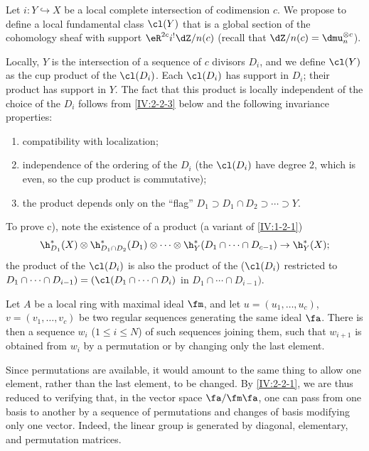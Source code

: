 Let $i:Y\hookrightarrow X$ be a local complete intersection of codimension
$c$. We propose to define a local fundamental class $\cl(Y)$ that is a
global section of the cohomology sheaf with support
$\eR^{2c}i^! \dZ/n(c)$ (recall that $\dZ/n(c)=\dmu_n^{\otimes c}$).

Locally, $Y$ is the intersection of a sequence of $c$ divisors $D_i$, and we
define $\cl(Y)$ as the cup product of the $\cl(D_i)$. Each $\cl(D_i)$ has
support in $D_i$; their product has support in $Y$. The fact that this product
is locally independent of the choice of the $D_i$ follows from
\ref{IV:2-2-3} below and the following invariance properties:
\begin{enumerate}[\indent a)]
  \item compatibility with localization;
  \item independence of the ordering of the $D_i$ (the $\cl(D_i)$ have
    degree $2$, which is even, so the cup product is commutative);
  \item the product depends only on the ``flag''
    $D_1\supset D_1\cap D_2\supset \cdots\supset Y$.
\end{enumerate}
To prove c), note the existence of a product (a variant of
\ref{IV:1-2-1})
\[
  \h_{D_1}^*(X)\otimes \h_{D_1\cap D_2}^*(D_1)\otimes \cdots \otimes \h_Y^*(D_1\cap \cdots \cap D_{c-1}) \to \h_Y^*(X) \text{;}
\]
the product of the $\cl(D_i)$ is also the product of the
($\cl(D_i)$ restricted to
$D_1\cap \cdots \cap D_{i-1})=(\cl(D_1\cap \cdots \cap D_i)$ in
$D_1\cap \cdots \cap D_{i-1})$.






\begin{lemma}\label{IV:2-2-3}
Let $A$ be a local ring with maximal ideal $\fm$, and let
$u=(u_1,\dots,u_c)$, $v=(v_1,\dots,v_c)$ be two regular sequences generating
the same ideal $\fa$. There is then a sequence $w_i$
($1\leqslant i\leqslant N$) of such sequences joining them, such that
$w_{i+1}$ is obtained from $w_i$ by a permutation or by changing only the
last element.
\end{lemma}

Since permutations are available, it would amount to the same thing to allow
one element, rather than the last element, to be changed. By
\ref{IV:2-2-1}, we are thus reduced to verifying that, in the vector space
$\fa/\fm\fa$, one can pass from one basis to another by a sequence of
permutations and changes of basis modifying only one vector. Indeed, the
linear group is generated by diagonal, elementary, and permutation matrices.






